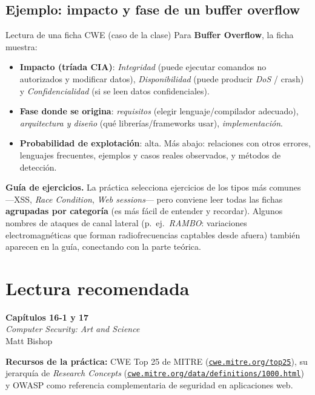 \documentclass[11pt,a4paper]{article}
\begin{document}
\subsection{Ejemplo: impacto y fase de un buffer overflow}
\begin{practbox}{Lectura de una ficha CWE (caso de la clase)}
Para \textbf{Buffer Overflow}, la ficha muestra:
\begin{itemize}[leftmargin=1.4em,itemsep=1pt]
  \item \textbf{Impacto (tríada CIA)}: \emph{Integridad} (puede ejecutar comandos no autorizados
        y modificar datos), \emph{Disponibilidad} (puede producir \emph{DoS} / crash) y
        \emph{Confidencialidad} (si se leen datos confidenciales).
  \item \textbf{Fase donde se origina}: \emph{requisitos} (elegir lenguaje/compilador adecuado),
        \emph{arquitectura y diseño} (qué librerías/frameworks usar), \emph{implementación}.
  \item \textbf{Probabilidad de explotación}: alta. Más abajo: relaciones con otros errores,
        lenguajes frecuentes, ejemplos y casos reales observados, y métodos de detección.
\end{itemize}
\end{practbox}

\begin{slidebox}
\textbf{Guía de ejercicios.} La práctica selecciona ejercicios de los tipos más comunes —XSS,
\emph{Race Condition}, \emph{Web sessions}— pero conviene leer todas las fichas \textbf{agrupadas
por categoría} (es más fácil de entender y recordar). Algunos nombres de ataques de canal lateral
(p.\ ej.\ \emph{RAMBO}: variaciones electromagnéticas que forman radiofrecuencias captables desde
afuera) también aparecen en la guía, conectando con la parte teórica.
\end{slidebox}

\section*{Lectura recomendada}
\begin{center}
\begin{tcolorbox}[enhanced,colback=itbaBlue!20,colframe=itbaCyanDark,boxrule=1pt,
  arc=3pt,width=0.85\textwidth,halign=center]
\large\textbf{Capítulos 16-1 y 17}\\[4pt]
\emph{Computer Security: Art and Science}\\[2pt]
Matt Bishop
\end{tcolorbox}
\end{center}
\noindent\textbf{Recursos de la práctica:} CWE Top 25 de MITRE
(\href{http://cwe.mitre.org/top25}{\texttt{cwe.mitre.org/top25}}), su jerarquía de \emph{Research
Concepts} (\href{https://cwe.mitre.org/data/definitions/1000.html}{\texttt{cwe.mitre.org/data/definitions/1000.html}})
y OWASP como referencia complementaria de seguridad en aplicaciones web.
\end{document}
